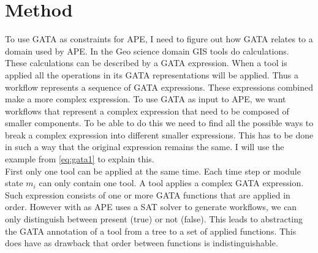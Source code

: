 \documentclass{article}
\begin{document}


\section{Method}

To use GATA as constraints for APE, I need to figure out how GATA relates to a domain used by APE. In the Geo science domain GIS tools do calculations. These calculations can be described by a GATA expression. When a tool is applied all the operations in its GATA representations will be applied. Thus a workflow represents a sequence of GATA expressions. These expressions combined make a more complex expression. To use GATA as input to APE, we want workflows that represent a complex expression that need to be composed of smaller components. To be able to do this we need to find all the possible ways to break a complex expression into different smaller expressions. This has to be done in such a way that the original expression remains the same. I will use the example from \ref{eq:gata1} to explain this. 
\\

First only one tool can be applied at the same time. Each time step or module state $m_i$ can only contain one tool. A tool applies a complex GATA expression. Such expression consists of one or more GATA functions that are applied in order. However with as APE uses a SAT solver to generate workflows, we can only distinguish between present (true) or not (false).  This leads to abstracting the GATA annotation of a tool from a tree to a set of applied functions. This does have as drawback that order between functions is indistinguishable.  
\end{document}
